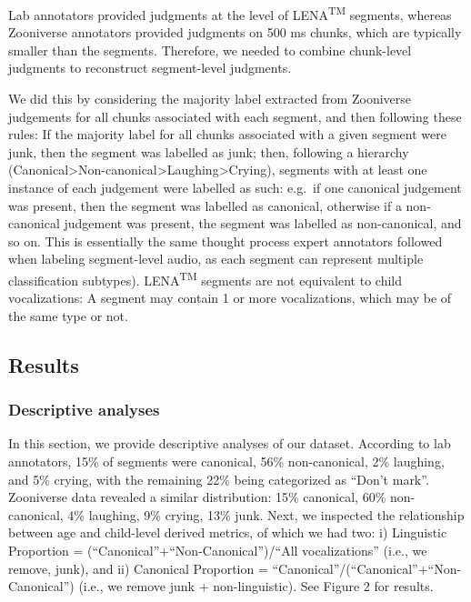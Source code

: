 \documentclass[english,,man,floatsintext]{apa6}
\begin{document}
Lab annotators provided judgments at the level of LENA\textsuperscript{TM} segments, whereas Zooniverse annotators provided judgments on 500 ms chunks, which are typically smaller than the segments. Therefore, we needed to combine chunk-level judgments to reconstruct segment-level judgments.

We did this by considering the majority label extracted from Zooniverse judgements for all chunks associated with each segment, and then following these rules: If the majority label for all chunks associated with a given segment were junk, then the segment was labelled as junk; then, following a hierarchy (Canonical\textgreater{}Non-canonical\textgreater{}Laughing\textgreater{}Crying), segments with at least one instance of each judgement were labelled as such: e.g.~if one canonical judgement was present, then the segment was labelled as canonical, otherwise if a non-canonical judgement was present, the segment was labelled as non-canonical, and so on. This is essentially the same thought process expert annotators followed when labeling segment-level audio, as each segment can represent multiple classification subtypes). LENA\textsuperscript{TM} segments are not equivalent to child vocalizations: A segment may contain 1 or more vocalizations, which may be of the same type or not.

\hypertarget{results}{%
\subsection{Results}\label{results}}

\hypertarget{descriptive-analyses}{%
\subsubsection{Descriptive analyses}\label{descriptive-analyses}}

In this section, we provide descriptive analyses of our dataset. According to lab annotators, 15\% of segments were canonical, 56\% non-canonical, 2\% laughing, and 5\% crying, with the remaining 22\% being categorized as \enquote{Don't mark}. Zooniverse data revealed a similar distribution: 15\% canonical, 60\% non-canonical, 4\% laughing, 9\% crying, 13\% junk.
Next, we inspected the relationship between age and child-level derived metrics, of which we had two: i) Linguistic Proportion = (\enquote{Canonical}+\enquote{Non-Canonical})/\enquote{All vocalizations} (i.e., we remove, junk), and ii) Canonical Proportion = \enquote{Canonical}/(\enquote{Canonical}+\enquote{Non-Canonical}) (i.e., we remove junk + non-linguistic). See Figure 2 for results.
\end{document}

